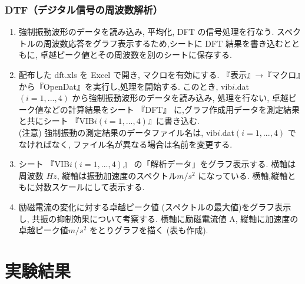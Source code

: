 \documentclass[a4paper,10.5pt]{jsarticle}
\begin{document}
\subsubsection{DTF（デジタル信号の周波数解析）}
\begin{enumerate}
  \item 強制振動波形のデータを読み込み, 平均化, DFT の信号処理を行なう. 
  スペクトルの周波数応答をグラフ表示するため,シートに DFT 結果を書き込むとともに,
  卓越ピーク値とその周波数を別のシートに保存する.
  \item 配布した dft.xls を Excel で開き, マクロを有効にする.
  『表示』→『マクロ』から『OpenDat』を実行し,処理を開始する.
  このとき, vib$i$.dat $(i=1,..., 4)$ から強制振動波形のデータを読み込み, 
  処理を行ない, 卓越ピーク値などの計算結果をシート 『DFT』 に,グラフ作成用データを測定結果と共にシート 
  『VIB$i(i=1,...,4)$』に書き込む. \\
  (注意) 強制振動の測定結果のデータファイル名は,
  vib$i$.dat$(i=1,..., 4)$ でなければなく, ファイル名が異なる場合は名前を変更する.
  \item シート 『VIB$i(i=1,..., 4)$』 の「解析データ」をグラフ表示する. 
  横軸は周波数 $Hz$, 縦軸は振動加速度のスペクトル$m/s^2$ になっている. 横軸,縦軸ともに対数スケールにして表示する.
  \item 励磁電流の変化に対する卓越ピーク値 (スペクトルの最大値)をグラフ表示し,
  共振の抑制効果について考察する. 横軸に励磁電流値 A, 縦軸に加速度の卓越ピーク値$m/s^2$ をとりグラフを描く (表も作成).
\end{enumerate}
\section{実験結果}
\end{document}
